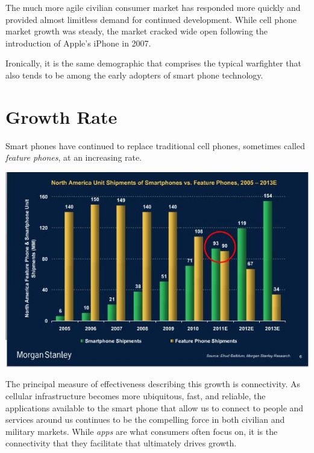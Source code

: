 \documentclass[letterpaper,12pt]{article}
\begin{document}
The much more agile civilian consumer market has responded more quickly and provided almost limitless demand for continued development.  While cell phone market growth was steady, the market cracked wide open following the introduction of Apple's iPhone in 2007.

Ironically, it is the same demographic that comprises the typical warfighter that also tends to be among the early adopters of smart phone technology.

\section*{Growth Rate}
Smart phones have continued to replace traditional cell phones, sometimes called \emph{feature phones}, at an increasing rate.  

\begin{center}
\includegraphics[scale=0.5]{images/growthRate}
\end{center} 

The principal measure of effectiveness describing this growth is connectivity. As cellular infrastructure becomes more ubiquitous, fast, and reliable, the applications available to the smart phone that allow us to connect to people and services around us continues to be the compelling force in both civilian and military markets.  While \emph{apps} are what consumers often focus on, it is the connectivity that they facilitate that ultimately drives growth.
\end{document}
